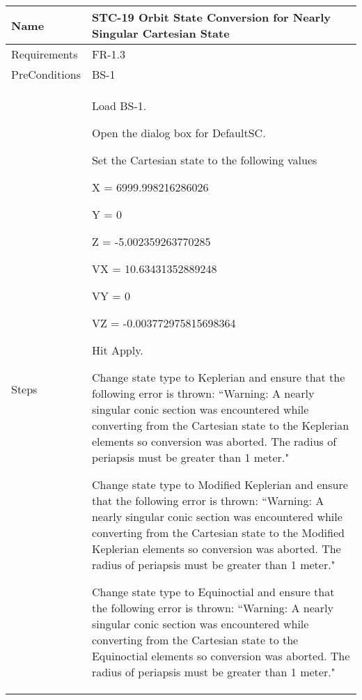 \begin{table}[htbp!]
\centering\footnotesize
      \begin{tabular}{|p{1.05 in} |p{4.75 in} |}
      \hline
         \rowcolor[rgb]{0.8,0.8,0.8} Name & STC-19 Orbit State Conversion for Nearly Singular Cartesian State\\
         \hline
         Requirements & FR-1.3\\  \hline
         PreConditions & BS-1\\     \hline
        Steps &
         \begin{compactenum}
             \item Load BS-1.
             \item Open the dialog box for DefaultSC.
             \item Set the Cartesian state to the following values
                 \begin{compactenum}
                    \item X  = 6999.998216286026
                    \item Y = 0
                    \item Z = -5.002359263770285
                    \item VX = 10.63431352889248
                    \item VY = 0
                    \item VZ =  -0.003772975815698364
                    \end{compactenum}
             \item Hit Apply.
             \item Change state type to Keplerian and ensure that the following error is thrown: ``Warning: A nearly singular conic section was encountered while converting from the Cartesian state to the Keplerian elements so conversion was aborted.  The radius of periapsis must be greater than 1 meter."
             \item Change state type to Modified Keplerian and ensure that the following error is thrown: ``Warning: A nearly singular conic section was encountered while converting from the Cartesian state to the Modified Keplerian elements so conversion was aborted.  The radius of periapsis must be greater than 1 meter."
             \item Change state type to Equinoctial and ensure that the following error is thrown:  ``Warning: A nearly singular conic section was encountered while converting from the Cartesian state to the Equinoctial elements so conversion was aborted.  The radius of periapsis must be greater than 1 meter."

\end{compactenum}
\end{tabular}
\end{table}
